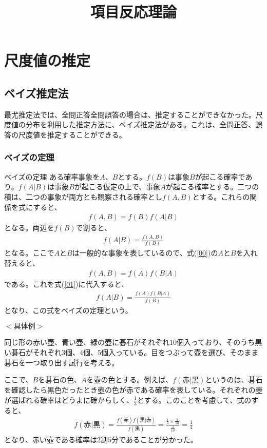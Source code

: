 \documentclass[12pt]{jarticle}
\title{項目反応理論}
\begin{document}
\maketitle
\setcounter{section}{2}
\section{尺度値の推定}
\setcounter{subsection}{3}
\subsection{ベイズ推定法}
最尤推定法では、全問正答全問誤答の場合は、推定することができなかった。尺度値の分布を利用した推定方法に、ベイズ推定法がある。これは、全問正答、誤答の尺度値を推定することができる。
\subsubsection{ベイズの定理}
\begin{itembox}[l]{ベイズの定理}
  ある確率事象を$A$、$B$とする。$f(B)$は事象$B$が起こる確率であり。$f(A|B)$は事象$B$が起こる仮定の上で、事象$A$が起こる確率とする。二つの積は、二つの事象が両方とも観察される確率とし$f(A,B)$とする。これらの関係を式にすると、
  \begin{align}
    \label{00}
    \displaystyle f(A,B) = f(B)f(A|B) \tag{3.24}
  \end{align}
  となる。両辺を$f(B)$で割ると、
  \begin{align}
    \label{01}
    \displaystyle f(A|B) = \frac{f(A,B)}{f(B)} \tag{3.25}
  \end{align}
  となる。ここで$A$と$B$は一般的な事象を表しているので、式(\ref{00})の$A$と$B$を入れ替えると、
  \begin{align}
    \label{02}
    \displaystyle f(A,B) = f(A)f(B|A) \tag{3.26}
  \end{align}
  である。これを式(\ref{01})に代入すると、
  \begin{align}
    \label{03}
    \displaystyle f(A|B) = \frac{f(A)f(B|A)}{f(B)} \tag{3.27}
  \end{align}
  となり、この式をベイズの定理という。
\end{itembox}
\newpage
$<具体例>$

同じ形の赤い壺、青い壺、緑の壺に碁石がそれぞれ$10$個入っており、そのうち黒い碁石がそれぞれ$3$個、$4$個、$5$個入っている。目をつぶって壺を選び、そのまま碁石を一つ取り出す試行を考える。

ここで、$B$を碁石の色、$A$を壺の色とする。例えば、$f(赤|黒)$というのは、碁石を確認したら黒色だったとき壺の色が赤である確率を表している。それぞれの壺が選ばれる確率はどうよに確からしく、$\displaystyle\frac{1}{3}$とする。このことを考慮して、式のすると、
\begin{align}
  \label{04}
  \displaystyle f(赤|黒) = \frac{f(赤)f(黒|赤)}{f(黒)} = \frac{\frac{1}{3} \times \frac{3}{10}}{\frac{4}{10}} = \frac{1}{4} \tag{3.28}
\end{align}
となり、赤い壺である確率は$2$割$5$分であることが分かった。
\end{document}
